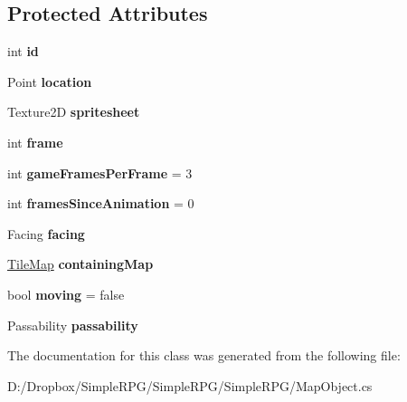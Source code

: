 \subsection*{Protected Attributes}
\begin{DoxyCompactItemize}
\item 
\hypertarget{class_simple_r_p_g_1_1_map_object_ae014494246731c8ab9dc257ce4f2014f}{int {\bfseries id}}\label{class_simple_r_p_g_1_1_map_object_ae014494246731c8ab9dc257ce4f2014f}

\item 
\hypertarget{class_simple_r_p_g_1_1_map_object_abadd8bb893f7105e5d58914377da004b}{Point {\bfseries location}}\label{class_simple_r_p_g_1_1_map_object_abadd8bb893f7105e5d58914377da004b}

\item 
\hypertarget{class_simple_r_p_g_1_1_map_object_a74de510fc5519cc030fbd40278b3055b}{Texture2\+D {\bfseries spritesheet}}\label{class_simple_r_p_g_1_1_map_object_a74de510fc5519cc030fbd40278b3055b}

\item 
\hypertarget{class_simple_r_p_g_1_1_map_object_af2cc5123349a39665908ae723499dc89}{int {\bfseries frame}}\label{class_simple_r_p_g_1_1_map_object_af2cc5123349a39665908ae723499dc89}

\item 
\hypertarget{class_simple_r_p_g_1_1_map_object_a2f5dd4ec31a9caa81a54f7897ebbc4c7}{int {\bfseries game\+Frames\+Per\+Frame} = 3}\label{class_simple_r_p_g_1_1_map_object_a2f5dd4ec31a9caa81a54f7897ebbc4c7}

\item 
\hypertarget{class_simple_r_p_g_1_1_map_object_a8400e2878a7be96b986b3cb9c4540e25}{int {\bfseries frames\+Since\+Animation} = 0}\label{class_simple_r_p_g_1_1_map_object_a8400e2878a7be96b986b3cb9c4540e25}

\item 
\hypertarget{class_simple_r_p_g_1_1_map_object_acd8ae5f5cec25d5d2c5b8007204f2f2f}{Facing {\bfseries facing}}\label{class_simple_r_p_g_1_1_map_object_acd8ae5f5cec25d5d2c5b8007204f2f2f}

\item 
\hypertarget{class_simple_r_p_g_1_1_map_object_a80ed5dceff7ef41541cd975a55a52b01}{\hyperlink{class_simple_r_p_g_1_1_tile_map}{Tile\+Map} {\bfseries containing\+Map}}\label{class_simple_r_p_g_1_1_map_object_a80ed5dceff7ef41541cd975a55a52b01}

\item 
\hypertarget{class_simple_r_p_g_1_1_map_object_a96cebab1a15feda253342be768c52343}{bool {\bfseries moving} = false}\label{class_simple_r_p_g_1_1_map_object_a96cebab1a15feda253342be768c52343}

\item 
\hypertarget{class_simple_r_p_g_1_1_map_object_aa03f7e7baaec7a1076771ceed3d4ae70}{Passability {\bfseries passability}}\label{class_simple_r_p_g_1_1_map_object_aa03f7e7baaec7a1076771ceed3d4ae70}

\end{DoxyCompactItemize}


The documentation for this class was generated from the following file\+:\begin{DoxyCompactItemize}
\item 
D\+:/\+Dropbox/\+Simple\+R\+P\+G/\+Simple\+R\+P\+G/\+Simple\+R\+P\+G/Map\+Object.\+cs\end{DoxyCompactItemize}
